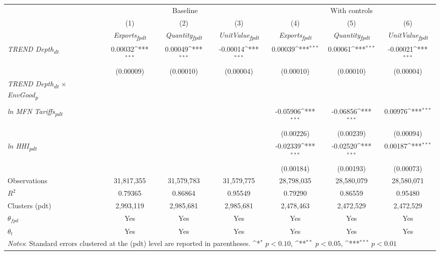 {
\def\sym#1{\ifmmode^{#1}\else\(^{#1}\)\fi}
\begin{tabular}{l*{6}{c}}
\toprule
&\multicolumn{3}{c}{Baseline}&\multicolumn{3}{c}{With controls}\\\cmidrule(lr){2-4}\cmidrule(lr){5-7}
&(1)&(2)&(3)&(4)&(5)&(6)\\
&\textit{Exports\textsubscript{fpdt}}&\textit{Quantity\textsubscript{fpdt}}&\textit{UnitValue\textsubscript{fpdt}}&\textit{Exports\textsubscript{fpdt}}&\textit{Quantity\textsubscript{fpdt}}&\textit{UnitValue\textsubscript{fpdt}}\\
\midrule
\textit{TREND Depth\textsubscript{dt}} & 0.00032\sym{***} & 0.00049\sym{***} & -0.00014\sym{***} & 0.00039\sym{***} & 0.00061\sym{***} & -0.00021\sym{***}\\
 & (0.00009) & (0.00010) & (0.00004) & (0.00010) & (0.00010) & (0.00004)\\
\addlinespace
\textit{TREND Depth\textsubscript{dt} $\times$ EnvGood\textsubscript{p}} &  &  &  &  &  & \\
 &  &  &  &  &  & \\
\addlinespace
\textit{ln MFN Tariffs\textsubscript{pdt}} &  &  &  & -0.05906\sym{***} & -0.06856\sym{***} & 0.00976\sym{***}\\
 &  &  &  & (0.00226) & (0.00239) & (0.00094)\\
\addlinespace
\textit{ln HHI\textsubscript{pdt}} &  &  &  & -0.02339\sym{***} & -0.02520\sym{***} & 0.00187\sym{***}\\
 &  &  &  & (0.00184) & (0.00193) & (0.00073)\\
\midrule
Observations & 31,817,355 & 31,579,783 & 31,579,775 & 28,798,035 & 28,580,079 & 28,580,071\\
$R^{2}$ & 0.79365 & 0.86864 & 0.95549 & 0.79290 & 0.86559 & 0.95480\\
Clusters (pdt) & 2,993,119 & 2,985,681 & 2,985,681 & 2,478,463 & 2,472,529 & 2,472,529\\
$\theta_{fpd}$ & Yes & Yes & Yes & Yes & Yes & Yes\\
$\theta_{t}$ & Yes & Yes & Yes & Yes & Yes & Yes\\
\bottomrule
\multicolumn{7}{l}{\footnotesize \textit{Notes}: Standard errors clustered at the (pdt) level are reported in parentheses. \sym{*} \(p<0.10\), \sym{**} \(p<0.05\), \sym{***} \(p<0.01\)}\\
\end{tabular}
}
